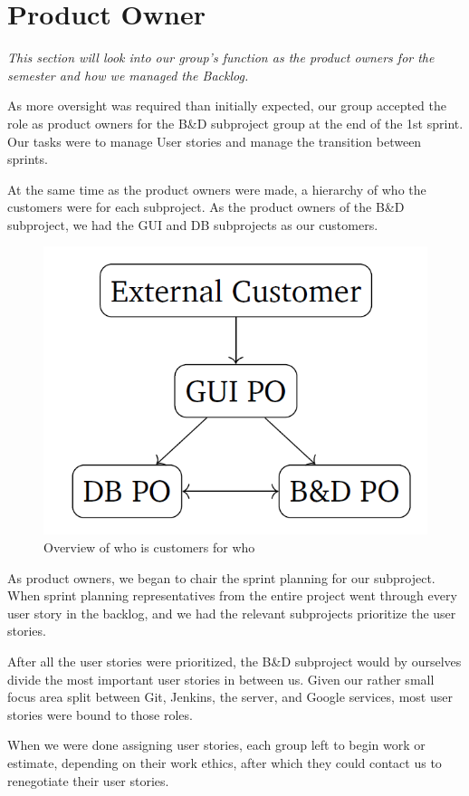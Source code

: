 \section{Product Owner} \label{Roles_SecProductOwner}
\textit{This section will look into our group’s function as the product owners for the semester and how we managed the Backlog.}

As more oversight was required than initially expected, our group accepted the role as product owners for the B\&D subproject group at the end of the 1st sprint. Our tasks were to manage User stories and manage the transition between sprints.

At the same time as the product owners were made, a hierarchy of who the customers were for each subproject. As the product owners of the B\&D subproject, we had the GUI and DB subprojects as our customers.

 \begin{figure}[H]
 	\centering
 	\includegraphics[width=0.6 \textwidth]{pictures/ProductOwnerRelation.png}
 	\caption{Overview of who is customers for who}
 	\label{AppLibependencies}
 \end{figure}
As product owners, we began to chair the sprint planning for our subproject. When sprint planning representatives from the entire project went through every user story in the backlog, and we had the relevant subprojects prioritize the user stories.

After all the user stories were prioritized, the B\&D subproject would by ourselves divide the most important user stories in between us. Given our rather small focus area split between Git, Jenkins, the server, and Google services, most user stories were bound to those roles.

When we were done assigning user stories, each group left to begin work or estimate, depending on their work ethics, after which they could contact us to renegotiate their user stories.

